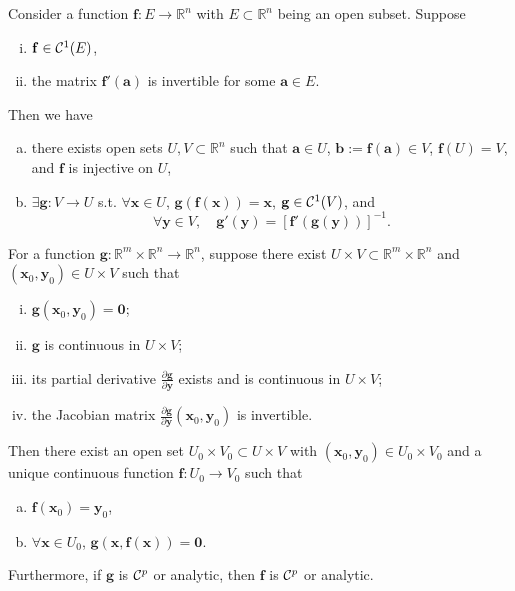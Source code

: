 \begin{thm}
  \label{thm:inverseFunc}
  Consider a function $\mathbf{f}: E\rightarrow \mathbb{R}^n$
  with $E\subset \mathbb{R}^n$ being an open subset.
  Suppose
  \begin{enumerate}[(i)]\itemsep0em
  \item $\mathbf{f}\in {\cal C}^1(E)$,
  \item the matrix $\mathbf{f}'(\mathbf{a})$
    is invertible for some $\mathbf{a}\in E$. 
  \end{enumerate}
  Then we have
  \begin{enumerate}[(a)]\itemsep0em
  \item there exists open sets
    $U,V\subset \mathbb{R}^n$ such that
    $\mathbf{a}\in U$, $\mathbf{b}:=\mathbf{f}(\mathbf{a})\in V$,
    $\mathbf{f}(U)=V$, and $\mathbf{f}$ is injective on $U$,
  \item $\exists \mathbf{g}: V\rightarrow U$ s.t.
    $\forall \mathbf{x}\in U$, $\mathbf{g}(\mathbf{f}(\mathbf{x}))=\mathbf{x}$, $\mathbf{g}\in {\cal C}^1(V)$,
    and
    \begin{equation}
      \label{eq:inverseFuncDeriv}
      \forall \mathbf{y}\in V,\quad
      \mathbf{g}'(\mathbf{y}) = [\mathbf{f}'(\mathbf{g}(\mathbf{y}))]^{-1}.
    \end{equation}
  \end{enumerate}
\end{thm}


\begin{thm}
  \label{thm:implicitFunction}
  For a function $\mathbf{g}:
  \mathbb{R}^m\times \mathbb{R}^n\to \mathbb{R}^n$,
  suppose there exist
  $U\times V\subset \mathbb{R}^m\times \mathbb{R}^n$
  and $(\mathbf{x}_0, \mathbf{y}_0)\in U\times V$
  such that
  \begin{enumerate}[(i)]\itemsep0em
  \item $\mathbf{g}(\mathbf{x}_0, \mathbf{y}_0)=\mathbf{0}$; 
  \item $\mathbf{g}$ is continuous in $U\times V$;
  \item its partial derivative $\frac{\partial \mathbf{g}}{\partial \mathbf{y}}$
    exists and is continuous in $U\times V$;
  \item the Jacobian matrix
    $\frac{\partial \mathbf{g}}{\partial \mathbf{y}}(\mathbf{x}_0, \mathbf{y}_0)$ is invertible.
  \end{enumerate}
  Then there exist an open set $U_0\times V_0\subset U\times V$
  with $(\mathbf{x}_0,\mathbf{y}_0)\in U_0\times V_0$
  and a unique continuous function $\mathbf{f}: U_0\to V_0$
  such that
  \begin{enumerate}[(a)]\itemsep0em
  \item $\mathbf{f}(\mathbf{x}_0) = \mathbf{y}_0$, 
  \item $\forall \mathbf{x}\in U_0$,
    $\mathbf{g}(\mathbf{x}, \mathbf{f}(\mathbf{x}))=\mathbf{0}$. 
  \end{enumerate}
  Furthermore, if $\mathbf{g}$ is ${\cal C}^p$ or analytic,
  then $\mathbf{f}$ is ${\cal C}^p$ or analytic.
\end{thm}




